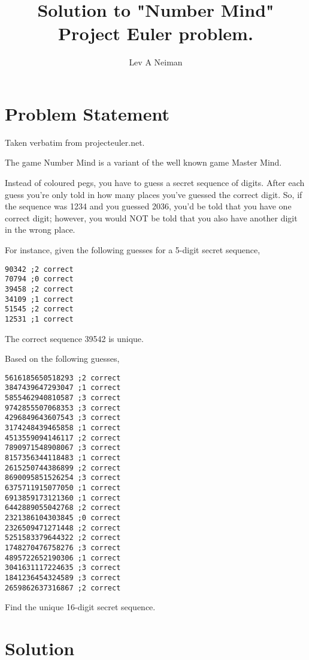 \documentclass[11pt]{article}
\begin{document}
\title{Solution to "Number Mind" Project Euler problem.\cite{numbermind}}
\author{Lev A Neiman}

\maketitle

\section{Problem Statement}

Taken verbatim from projecteuler.net.

The game Number Mind is a variant of the well known game Master Mind.

Instead of coloured pegs, you have to guess a secret sequence of digits. After each guess you're only told in how many places you've guessed the correct digit. So, if the sequence was 1234 and you guessed 2036, you'd be told that you have one correct digit; however, you would NOT be told that you also have another digit in the wrong place.

For instance, given the following guesses for a 5-digit secret sequence,
\begin{verbatim}
90342 ;2 correct
70794 ;0 correct
39458 ;2 correct
34109 ;1 correct
51545 ;2 correct
12531 ;1 correct
\end{verbatim}

The correct sequence 39542 is unique.

Based on the following guesses,

\begin{verbatim}
5616185650518293 ;2 correct
3847439647293047 ;1 correct
5855462940810587 ;3 correct
9742855507068353 ;3 correct
4296849643607543 ;3 correct
3174248439465858 ;1 correct
4513559094146117 ;2 correct
7890971548908067 ;3 correct
8157356344118483 ;1 correct
2615250744386899 ;2 correct
8690095851526254 ;3 correct
6375711915077050 ;1 correct
6913859173121360 ;1 correct
6442889055042768 ;2 correct
2321386104303845 ;0 correct
2326509471271448 ;2 correct
5251583379644322 ;2 correct
1748270476758276 ;3 correct
4895722652190306 ;1 correct
3041631117224635 ;3 correct
1841236454324589 ;3 correct
2659862637316867 ;2 correct
\end{verbatim}

Find the unique 16-digit secret sequence.

\section{Solution}
\end{document}
